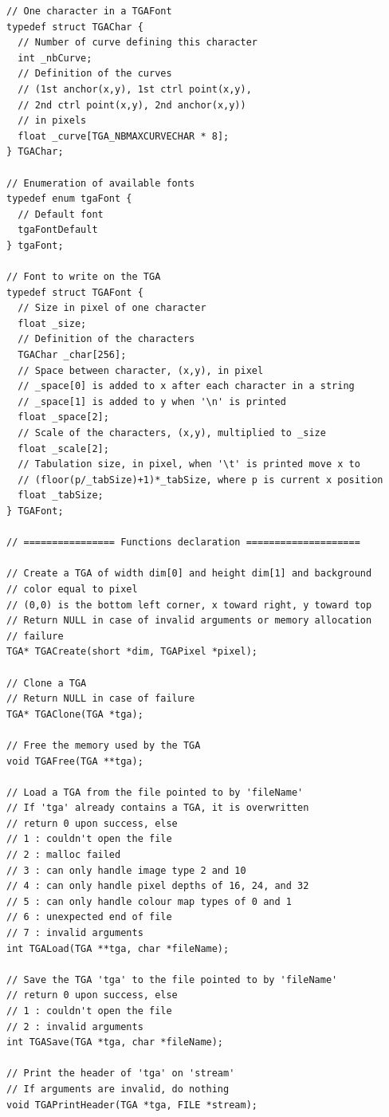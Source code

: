 \documentclass[12pt, a4paper]{article}
\begin{document}
\begin{scriptsize}
\begin{ttfamily}
\begin{lstlisting}
// One character in a TGAFont
typedef struct TGAChar {
  // Number of curve defining this character
  int _nbCurve;
  // Definition of the curves 
  // (1st anchor(x,y), 1st ctrl point(x,y), 
  // 2nd ctrl point(x,y), 2nd anchor(x,y))
  // in pixels
  float _curve[TGA_NBMAXCURVECHAR * 8];
} TGAChar;

// Enumeration of available fonts
typedef enum tgaFont {
  // Default font
  tgaFontDefault
} tgaFont;

// Font to write on the TGA
typedef struct TGAFont {
  // Size in pixel of one character
  float _size;
  // Definition of the characters
  TGAChar _char[256];
  // Space between character, (x,y), in pixel
  // _space[0] is added to x after each character in a string
  // _space[1] is added to y when '\n' is printed
  float _space[2];
  // Scale of the characters, (x,y), multiplied to _size
  float _scale[2];
  // Tabulation size, in pixel, when '\t' is printed move x to 
  // (floor(p/_tabSize)+1)*_tabSize, where p is current x position
  float _tabSize;
} TGAFont;

// ================ Functions declaration ====================

// Create a TGA of width dim[0] and height dim[1] and background
// color equal to pixel
// (0,0) is the bottom left corner, x toward right, y toward top
// Return NULL in case of invalid arguments or memory allocation
// failure
TGA* TGACreate(short *dim, TGAPixel *pixel);

// Clone a TGA
// Return NULL in case of failure
TGA* TGAClone(TGA *tga);

// Free the memory used by the TGA
void TGAFree(TGA **tga);

// Load a TGA from the file pointed to by 'fileName'
// If 'tga' already contains a TGA, it is overwritten
// return 0 upon success, else
// 1 : couldn't open the file
// 2 : malloc failed
// 3 : can only handle image type 2 and 10
// 4 : can only handle pixel depths of 16, 24, and 32
// 5 : can only handle colour map types of 0 and 1
// 6 : unexpected end of file
// 7 : invalid arguments
int TGALoad(TGA **tga, char *fileName);

// Save the TGA 'tga' to the file pointed to by 'fileName'
// return 0 upon success, else
// 1 : couldn't open the file
// 2 : invalid arguments
int TGASave(TGA *tga, char *fileName);

// Print the header of 'tga' on 'stream'
// If arguments are invalid, do nothing
void TGAPrintHeader(TGA *tga, FILE *stream);


\end{lstlisting}
\end{ttfamily}
\end{scriptsize}
\end{document}
